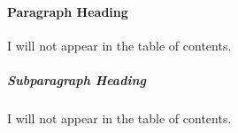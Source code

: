 \documentclass[
DToption=dissertation,%
]{wsu-dissertation-thesis}
\begin{document}
















\paragraph{Paragraph Heading}
I will not appear in the table of contents.
\lipsum[1]

\subparagraph{Subparagraph Heading}
I will not appear in the table of contents.
\lipsum[1]
\end{document}
